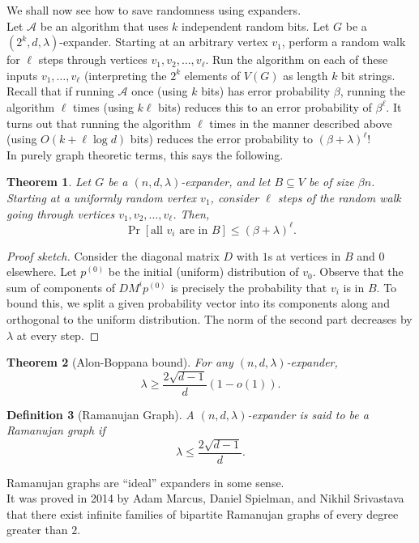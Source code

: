 \documentclass{article}
\newcounter{lecnum}
\newtheorem{theorem}{Theorem}[lecnum]
\newtheorem{definition}[theorem]{Definition}
\begin{document}
	We shall now see how to save randomness using expanders.\\

	Let $\mathcal{A}$ be an algorithm that uses $k$ independent random bits. Let $G$ be a $(2^k,d,\lambda)$-expander. Starting at an arbitrary vertex $v_1$, perform a random walk for $\ell$ steps through vertices $v_1,v_2,\ldots,v_{\ell}$. Run the algorithm on each of these inputs $v_1,\ldots,v_{\ell}$ (interpreting the $2^k$ elements of $V(G)$ as length $k$ bit strings.\\
	
	Recall that if running $\mathcal{A}$ once (using $k$ bits) has error probability $\beta$, running the algorithm $\ell$ times (using $k\ell$ bits) reduces this to an error probability of $\beta^\ell$. It turns out that running the algorithm $\ell$ times in the manner described above (using $O(k+\ell\log d)$ bits) reduces the error probability to $(\beta+\lambda)^{\ell}$!\\
	In purely graph theoretic terms, this says the following.

	\begin{theorem}
		Let $G$ be a $(n,d,\lambda)$-expander, and let $B \subseteq V$ be of size $\beta n$. Starting at a uniformly random vertex $v_1$, consider $\ell$ steps of the random walk going through vertices $v_1,v_2,\ldots,v_{\ell}$. Then,
		\[ \Pr \left[ \text{all $v_i$ are in $B$} \right] \le (\beta+\lambda)^\ell. \]
	\end{theorem}
	\begin{proof}[Proof sketch]
		Consider the diagonal matrix $D$ with $1$s at vertices in $B$ and $0$ elsewhere. Let $p^{(0)}$ be the initial (uniform) distribution of $v_0$. Observe that the sum of components of $DM^{i} p^{(0)}$ is precisely the probability that $v_i$ is in $B$. %
		To bound this, we split a given probability vector into its components along and orthogonal to the uniform distribution. The norm of the second part decreases by $\lambda$ at every step.
	\end{proof}

	\begin{theorem}[Alon-Boppana bound]
		For any $(n,d,\lambda)$-expander,
		\[ \lambda \ge \frac{2\sqrt{d-1}}{d}(1 - o(1)). \]
	\end{theorem}

	\begin{definition}[Ramanujan Graph]
		A $(n,d,\lambda)$-expander is said to be a \emph{Ramanujan graph} if
		\[ \lambda \le \frac{2\sqrt{d-1}}{d}. \]
	\end{definition}
	Ramanujan graphs are ``ideal'' expanders in some sense.\\
	It was proved in 2014 by Adam Marcus, Daniel Spielman, and Nikhil Srivastava that there exist infinite families of bipartite Ramanujan graphs of every degree greater than $2$.
\end{document}
